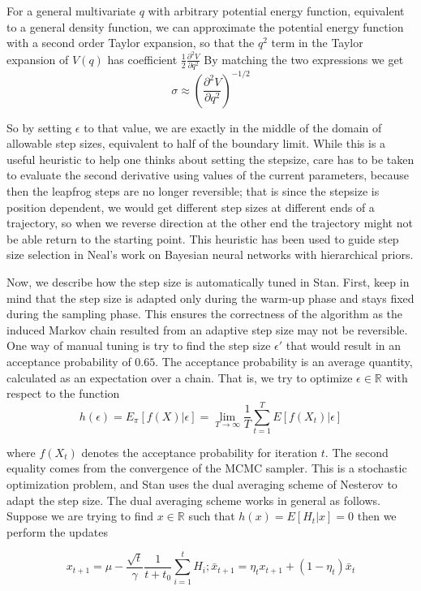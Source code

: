 \documentclass[12pt]{report}
\begin{document}
For a general multivariate $q$ with arbitrary potential energy function, equivalent to a general density function, we can approximate the potential energy function with a second order Taylor expansion, so that the $q^2$ term in the Taylor expansion of $V(q)$ has coefficient $\frac{1}{2} \frac{\partial^2 V}{\partial q^2}$  
By matching the two expressions we get 
\[ \sigma \approx ( \frac{\partial^2 V}{\partial q^2})^{-1/2} \]

So by setting $\epsilon$ to that value, we are exactly in the middle of the domain of allowable step sizes, equivalent to half of the boundary limit. While this is a useful heuristic to help one thinks about setting the stepsize,
care has to be taken to evaluate the second derivative using values of the current parameters, because then the leapfrog steps are no longer reversible; that is since the stepsize is position dependent, we would get different step sizes at different ends of a trajectory, so when we reverse direction at the other end the trajectory might not be able return to the starting point. This heuristic has been used to guide step size selection in Neal's work on Bayesian neural networks with hierarchical priors.


Now, we describe how the step size is automatically tuned in Stan. First, keep
in mind that the step size is adapted only during the warm-up phase and stays
fixed during the sampling phase. This ensures the correctness of the algorithm
as the induced Markov chain resulted from an adaptive step size may not be
reversible. One way of manual tuning is try to find the step size
$\epsilon'$ that would result in an acceptance probability of $0.65$. The
acceptance probability is an average quantity, calculated as an expectation
over a chain. That is, we try to optimize $\epsilon \in \mathbb{R}$ with respect
to the function 
\[ h(\epsilon) = E_\pi[f(X)|\epsilon]  = \lim_{T \rightarrow \infty} \frac{1}{T}
\sum_{t=1}^T E[f(X_t)|\epsilon] \]

where $f(X_t)$ denotes the acceptance probability for iteration $t$. The
second equality comes from the convergence of the MCMC sampler. This is a
stochastic optimization problem, and Stan uses the dual averaging scheme of
Nesterov  to adapt the step size. The dual averaging scheme works in general as
follows. Suppose we are trying to find $x\in \mathbb{R}$ such that $h(x) =
E[H_t|x] = 0$ then we perform the updates 

\[x_{t+1}  = \mu - \frac{\sqrt{t}}{\gamma} \frac{1}{t+t_0} \sum_{i=1}^tH_i;
\bar{x}_{t+1} = \eta_t x_{t+1} + (1-\eta_t) \bar{x}_t \]
\end{document}

